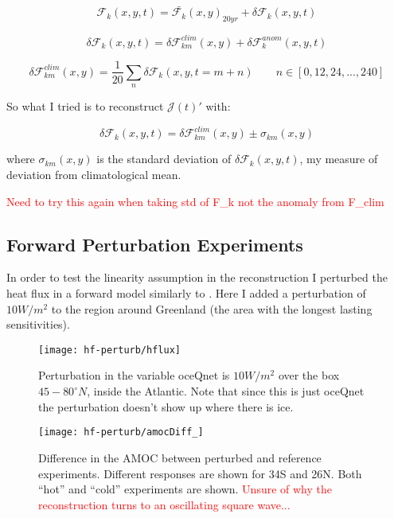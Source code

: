 \documentclass[a4paper,11pt]{article}
\newcommand{\red}[1]{\textcolor{red}{#1}}
\begin{document}
  \begin{equation}
	\mathcal{F}_k(x,y,t) = \bar{\mathcal{F}_k}(x,y)_{20yr} + \delta\mathcal{F}_k(x,y,t)
  \end{equation}

  \begin{equation}
	\delta\mathcal{F}_k(x,y,t) = \delta\mathcal{F}_{km}^{clim}(x,y) + \delta\mathcal{F}_{k}^{anom}(x,y,t)
  \end{equation}

  \begin{equation}
	\delta\mathcal{F}_{km}^{clim}(x,y) = \dfrac{1}{20}\sum_n\delta\mathcal{F}_k(x,y,t=m+n) \qquad n \in [0,12,24,...,240]
  \end{equation}

  So what I tried is to reconstruct $\mathcal{J}(t)'$ with:

  \begin{equation}
	\delta\mathcal{F}_k(x,y,t) = \delta\mathcal{F}_{km}^{clim}(x,y) \pm \sigma_{km}(x,y)	
  \end{equation}

  where $\sigma_{km}(x,y)$ is the standard deviation of $\delta\mathcal{F}_k(x,y,t)$, my measure of deviation from climatological mean. 

  \red{Need to try this again when taking std of F\_k not the anomaly from F\_clim}

  \subsection{Forward Perturbation Experiments} 

  In order to test the linearity assumption in the reconstruction I perturbed the heat flux in a forward model similarly to \cite{czeschel}. Here I added a perturbation of $10 W/m^2$ to the region around Greenland (the area with the longest lasting sensitivities). 
  \begin{figure}
	\centering
	\texttt{[image: hf-perturb/hflux]}
	\caption{Perturbation in the variable oceQnet is $10 W/m^2$ over the box $45-80^{\circ}N$, inside the Atlantic. Note that since this is just oceQnet the perturbation doesn't show up where there is ice.}
	\label{fig:oceqnet_m10}
  \end{figure}

  \begin{figure}
	\centering
	\texttt{[image: hf-perturb/amocDiff\_]}
	\caption{Difference in the AMOC between perturbed and reference experiments. Different responses are shown for 34S and 26N. Both ``hot'' and ``cold'' experiments are shown. \red{Unsure of why the reconstruction turns to an oscillating square wave...}}
	\label{fig:amocDiff}
  \end{figure}
\end{document}
